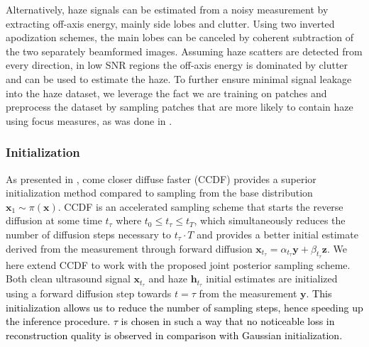 \documentclass[journal,twoside,web]{ieeecolor}
\newcommand{\bx}{{\mathbf x}}
\newcommand{\by}{{\mathbf y}}
\newcommand{\bh}{{\mathbf h}}
\newcommand{\bz}{{\mathbf z}}
\newcommand{\TSW}[1]{{\textcolor{black}{#1}}}
\begin{document}
Alternatively, haze signals can be estimated from a noisy measurement by extracting off-axis energy, mainly side lobes and clutter. Using two inverted apodization schemes, the main lobes can be canceled by coherent subtraction of the two separately beamformed images. Assuming haze scatters are detected from every direction, in low SNR regions the off-axis energy is dominated by clutter and can be used to estimate the haze. To further ensure minimal signal leakage into the haze dataset, we leverage the fact we are training on patches and preprocess the dataset by sampling patches that are more likely to contain haze using focus measures, as was done in \cite{vandeschaftUltrasoundSpeckleSuppression2021}.

\subsubsection{Initialization}
As presented in \cite{chungComeCloserDiffuseFasterAcceleratingConditional2022}, come closer diffuse faster (CCDF) provides a superior initialization method compared to sampling from the base distribution $\bx_1\sim\pi(\bx)$. CCDF is an accelerated sampling scheme that starts the reverse diffusion at some time $ t_\tau$ where $t_0 \leq t_\tau \leq t_T$, which simultaneously reduces the number of diffusion steps necessary to $t_\tau \cdot T$ and provides a better initial estimate derived from the measurement through forward diffusion $\bx_{t_\tau} = \alpha_{t_\tau}\by + \beta_{t_\tau} \bz$. We here extend CCDF to work with the proposed joint posterior sampling scheme. Both clean ultrasound signal $\bx_{t_\tau}$ and haze $\bh_{t_\tau}$ initial estimates are initialized using a forward diffusion step towards $t=\tau$ from the measurement $\by$. \TSW{This initialization allows us to reduce the number of sampling steps, hence speeding up the inference procedure. $\tau$ is chosen in such a way that no noticeable loss in reconstruction quality is observed in comparison with Gaussian initialization.}
\end{document}
